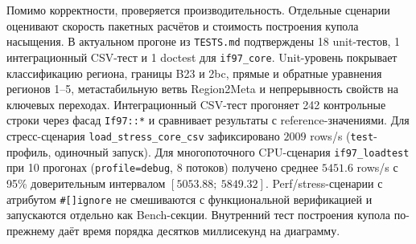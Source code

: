 Помимо корректности, проверяется производительность.
Отдельные сценарии оценивают
скорость пакетных расчётов и стоимость построения купола насыщения.
В актуальном прогоне из \texttt{TESTS.md}
подтверждены 18 unit-тестов,
1 интеграционный CSV-тест
и 1 doctest для \texttt{if97\_core}.
Unit-уровень покрывает
классификацию региона,
границы B23 и 2bc,
прямые и обратные уравнения регионов 1--5,
метастабильную ветвь Region2Meta
и непрерывность свойств на ключевых переходах.
Интеграционный CSV-тест
прогоняет 242 контрольные строки
через фасад \texttt{If97::*}
и сравнивает результаты с reference-значениями.
Для стресс-сценария \texttt{load\_stress\_core\_csv}
зафиксировано $2009$ rows/s
(\texttt{test}-профиль, одиночный запуск).
Для многопоточного CPU-сценария \texttt{if97\_loadtest}
при 10 прогонах (\texttt{profile=debug}, 8 потоков)
получено среднее $5451.6$ rows/s
с 95\% доверительным интервалом $[5053.88;\ 5849.32]$.
Perf/stress-сценарии с атрибутом \texttt{\#[]ignore}
не смешиваются с функциональной верификацией
и запускаются отдельно как Bench-секции.
Внутренний тест построения купола
по-прежнему даёт время порядка десятков миллисекунд на диаграмму.
